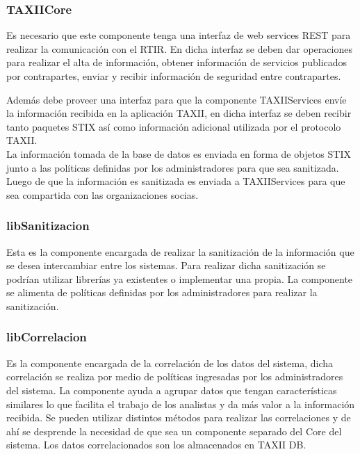 	\subsubsection{TAXIICore}
	Es necesario que este componente tenga una interfaz de web services REST para realizar la
		comunicación con el RTIR. En dicha interfaz se deben dar operaciones para realizar el alta de información, obtener
		información de servicios publicados por contrapartes, enviar y recibir información de seguridad entre contrapartes.\\
		\bigskip

	Además debe proveer una interfaz para que la componente TAXIIServices envíe la información
		recibida en la aplicación TAXII, en dicha interfaz se deben recibir tanto paquetes STIX así como información adicional
		utilizada por el protocolo TAXII. \\
	\bigskip	
	La información tomada de la base de datos es enviada en forma de objetos STIX junto a las
		políticas definidas por los administradores para que sea sanitizada. Luego de que la información es sanitizada es
		enviada a TAXIIServices para que sea compartida con las organizaciones socias.
	
	\subsubsection{libSanitizacion}
	Esta es la componente encargada de realizar la sanitización de la información que se desea
		intercambiar entre los sistemas. Para realizar dicha sanitización se podrían utilizar librerías ya existentes o implementar una
		propia. La componente se alimenta de políticas definidas por los administradores para realizar la
		sanitización.
	
	\subsubsection{libCorrelacion}
	Es la componente encargada de la correlación de los datos del sistema, dicha correlación se
		realiza por medio de políticas ingresadas por los administradores del sistema. La componente ayuda a agrupar datos que
		tengan características similares lo que facilita el trabajo de los analistas y da más valor a la información recibida.
		Se pueden utilizar distintos métodos para realizar las correlaciones y de ahí se desprende la necesidad de que sea un
		componente separado del Core del sistema. Los datos correlacionados son los almacenados en TAXII DB.
	
